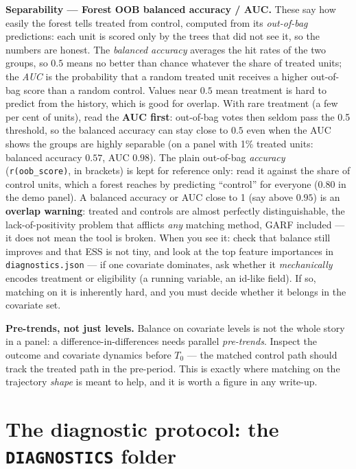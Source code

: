 \documentclass[11pt,a4paper]{article}
\newcommand{\code}[1]{\texttt{#1}}
\begin{document}
\medskip
\noindent\textbf{Separability --- Forest OOB balanced accuracy / AUC.} These say how easily the
forest tells treated from control, computed from its \emph{out-of-bag} predictions: each unit is
scored only by the trees that did not see it, so the numbers are honest. The \emph{balanced
accuracy} averages the hit rates of the two groups, so $0.5$ means no better than chance whatever
the share of treated units; the \emph{AUC} is the probability that a random treated unit receives a
higher out-of-bag score than a random control. Values near $0.5$ mean treatment is hard to predict
from the history, which is good for overlap. With rare treatment (a few per cent of units), read
the \textbf{AUC first}: out-of-bag votes then seldom pass the 0.5 threshold, so the balanced
accuracy can stay close to $0.5$ even when the AUC shows the groups are highly separable (on a
panel with 1\% treated units: balanced accuracy $0.57$, AUC $0.98$). The plain out-of-bag \emph{accuracy}
(\code{r(oob\_score)}, in brackets) is kept for reference only: read it against the share of control
units, which a forest reaches by predicting ``control'' for everyone ($0.80$ in the demo panel).
A balanced accuracy or AUC close to 1 (say above $0.95$) is an \textbf{overlap warning}: treated
and controls are almost perfectly distinguishable, the lack-of-positivity problem that afflicts \emph{any} matching method, GARF
included --- it does not mean the tool is broken. When you see it: check that balance still
improves and that ESS is not tiny, and look at the top feature importances in
\code{diagnostics.json} --- if one covariate dominates, ask whether it \emph{mechanically} encodes
treatment or eligibility (a running variable, an id-like field). If so, matching on it is
inherently hard, and you must decide whether it belongs in the covariate set.

\medskip
\noindent\textbf{Pre-trends, not just levels.} Balance on covariate levels is not the whole story
in a panel: a difference-in-differences needs parallel \emph{pre-trends}. Inspect the outcome and
covariate dynamics before $T_0$ --- the matched control path should track the treated path in the
pre-period. This is exactly where matching on the trajectory \emph{shape} is meant to help, and
it is worth a figure in any write-up.

\section{The diagnostic protocol: the \texttt{DIAGNOSTICS} folder}\label{sec:diagnostics}
\end{document}
